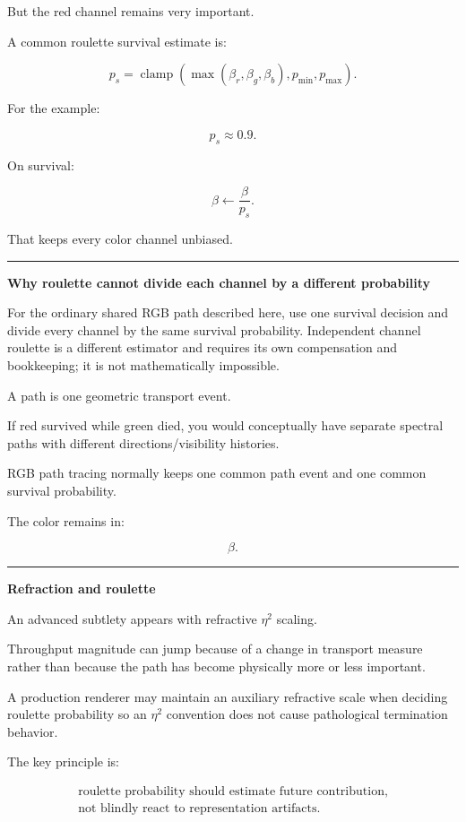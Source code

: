But the red channel remains very important.

A common roulette survival estimate is:

\[
\boxed{
p_s=
\operatorname{clamp}
(
\max(\beta_r,\beta_g,\beta_b),
p_{\min},
p_{\max}
).
}
\]

For the example:

\[
p_s\approx0.9.
\]

On survival:

\[
\boxed{
\beta\leftarrow\frac{\beta}{p_s}.
}
\]

That keeps every color channel unbiased.

\begin{center}\rule{0.5\linewidth}{0.5pt}\end{center}

\textbf{Why roulette cannot divide each channel by a different probability}

For the ordinary shared RGB path described here, use one survival decision and divide every channel by the same survival probability. Independent channel roulette is a different estimator and requires its own compensation and bookkeeping; it is not mathematically impossible.

A path is one geometric transport event.

If red survived while green died, you would conceptually have separate spectral paths with different directions/visibility histories.

RGB path tracing normally keeps one common path event and one common survival probability.

The color remains in:

\[
\beta.
\]

\begin{center}\rule{0.5\linewidth}{0.5pt}\end{center}

\textbf{Refraction and roulette}

An advanced subtlety appears with refractive \(\eta^2\) scaling.

Throughput magnitude can jump because of a change in transport measure rather than because the path has become physically more or less important.

A production renderer may maintain an auxiliary refractive scale when deciding roulette probability so an \(\eta^2\) convention does not cause pathological termination behavior.

The key principle is:

\[\boxed{\begin{gathered}\text{roulette probability should estimate future contribution,}\\\text{not blindly react to representation artifacts.}\end{gathered}}\]

